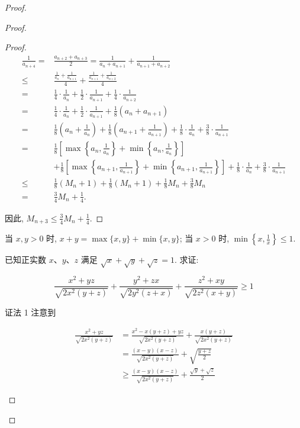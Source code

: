 \begin{proof}
\begin{example}
\begin{solution}
\begin{note}
\begin{solution}
\begin{proof}
\begin{proof}
	$$
	\begin{aligned}
	\frac{1}{a_{n+4}}= & \frac{a_{n+2}+a_{n+3}}{2}=\frac{1}{a_{n}+a_{n+1}}+\frac{1}{a_{n+1}+a_{n+2}} \\
	\leqslant & \frac{\frac{1}{a_{n}}+\frac{1}{a_{n+1}}}{4}+\frac{\frac{1}{a_{n+1}}+\frac{1}{a_{n+2}}}{4} \\
	= & \frac{1}{4} \cdot \frac{1}{a_{n}}+\frac{1}{2} \cdot \frac{1}{a_{n+1}}+\frac{1}{4} \cdot \frac{1}{a_{n+2}} \\
	= & \frac{1}{4} \cdot \frac{1}{a_{n}}+\frac{1}{2} \cdot \frac{1}{a_{n+1}}+\frac{1}{8}\left(a_{n}+a_{n+1}\right) \\
	= & \frac{1}{8}\left(a_{n}+\frac{1}{a_{n}}\right)+\frac{1}{8}\left(a_{n+1}+\frac{1}{a_{n+1}}\right)+\frac{1}{8} \cdot \frac{1}{a_{n}}+\frac{3}{8} \cdot \frac{1}{a_{n+1}} \\
	= & \frac{1}{8}\left[\max \left\{a_{n}, \frac{1}{a_{n}}\right\}+\min \left\{a_{n}, \frac{1}{a_{n}}\right\}\right] \\
	& +\frac{1}{8}\left[\max \left\{a_{n+1}, \frac{1}{a_{n+1}}\right\}+\min \left\{a_{n+1}, \frac{1}{a_{n+1}}\right\}\right]+\frac{1}{8} \cdot \frac{1}{a_{n}}+\frac{3}{8} \cdot \frac{1}{a_{n+1}} \\
	\leqslant & \frac{1}{8}\left(M_{n}+1\right)+\frac{1}{8}\left(M_{n}+1\right)+\frac{1}{8} M_{n}+\frac{3}{8} M_{n} \\
	= & \frac{3}{4} M_{n}+\frac{1}{4} .
	\end{aligned}
	$$
	
	因此, $M_{n+3} \leqslant \frac{3}{4} M_{n}+\frac{1}{4}$.
\end{proof}
\begin{note}
	当 $x, y>0$ 时, $x+y=\max \{x, y\}+\min \{x, y\}$; 当 $x>0$ 时, $\min \left\{x, \frac{1}{x}\right\} \leqslant 1$.
\end{note}

\begin{example}
	已知正实数 $x 、 y 、 z$ 满足 $\sqrt{x}+\sqrt{y}+\sqrt{z}=1$. 求证:
	
	$$
	\frac{x^{2}+y z}{\sqrt{2 x^{2}(y+z)}}+\frac{y^{2}+z x}{\sqrt{2 y^{2}(z+x)}}+\frac{z^{2}+x y}{\sqrt{2 z^{2}(x+y)}} \geqslant 1
	$$
	
	证法 1 注意到
	
	$$
	\begin{aligned}
	\frac{x^{2}+y z}{\sqrt{2 x^{2}(y+z)}} & =\frac{x^{2}-x(y+z)+y z}{\sqrt{2 x^{2}(y+z)}}+\frac{x(y+z)}{\sqrt{2 x^{2}(y+z)}} \\
	& =\frac{(x-y)(x-z)}{\sqrt{2 x^{2}(y+z)}}+\sqrt{\frac{y+z}{2}} \\
	& \geqslant \frac{(x-y)(x-z)}{\sqrt{2 x^{2}(y+z)}}+\frac{\sqrt{y}+\sqrt{z}}{2}
	\end{aligned}
	$$
	

\end{example}
\end{proof}
\end{solution}
\end{note}
\end{solution}
\end{example}
\end{proof}
